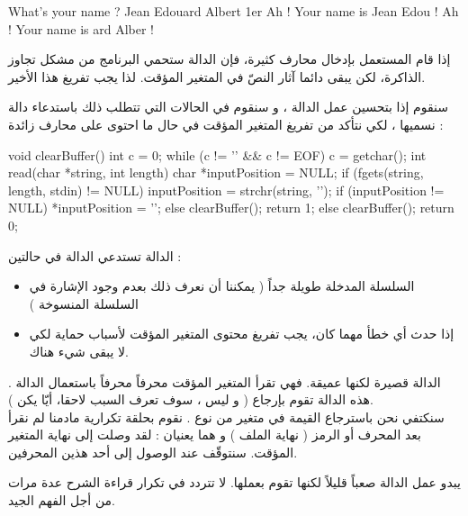 \begin{Console}
  What's your name ? Jean Edouard Albert 1er
  Ah ! Your name is Jean Edou !
  Ah ! Your name is ard Alber !
\end{Console}

إذا قام المستعمل بإدخال محارف كثيرة، فإن الدالة
ستحمي البرنامج من مشكل تجاوز الذاكرة، لكن يبقى دائما آثار النصّ في المتغير المؤقت. لذا يجب تفريغ هذا الأخير.

سنقوم إذا بتحسين عمل الدالة
،
و سنقوم في الحالات التي تتطلب ذلك باستدعاء دالة نسميها
،
لكي نتأكد من تفريغ المتغير المؤقت في حال ما احتوى على محارف زائدة :

\begin{Csource}
  void clearBuffer()
  {
  	int c = 0;
  	while (c != '\n' && c != EOF)
  	{
      		c = getchar();
  	}
  }
  int read(char *string, int length)
  {
  	char *inputPosition = NULL;
  	if (fgets(string, length, stdin) != NULL)
  	{
      		inputPosition = strchr(string, '\n');
      		if (inputPosition != NULL)
      		 {
          			*inputPosition = '\0';
      		}
      		else
      		 {
          			clearBuffer();
      		}
      		return 1;
  	 }
  	else
  	{
      		clearBuffer();
      		return 0;
  	 }
  }
\end{Csource}

الدالة
تستدعي الدالة
في حالتين :

\begin{itemize}
  \item السلسلة المدخلة طويلة جداً ( يمكننا أن نعرف ذلك بعدم وجود الإشارة
في السلسلة المنسوخة )
  \item إذا حدث أي خطأ مهما كان، يجب تفريغ محتوى المتغير المؤقت لأسباب حماية لكي لا يبقى شيء هناك.
\end{itemize}

الدالة
قصيرة لكنها عميقة. فهي تقرأ المتغير المؤقت محرفاً محرفاً باستعمال الدالة
.
هذه الدالة تقوم بإرجاع
( و ليس
،
سوف تعرف السبب لاحقا، أيّا يكن ).\\
سنكتفي نحن باسترجاع القيمة في متغير
من نوع
.
نقوم بحلقة تكرارية مادمنا لم نقرأ بعد المحرف
 أو الرمز
( نهاية الملف ) و هما يعنيان : لقد وصلت إلى نهاية المتغير المؤقت. سنتوقّف عند الوصول إلى أحد هذين المحرفين.

يبدو عمل الدالة
صعباً قليلاً لكنها تقوم بعملها. لا تتردد في تكرار قراءة الشرح عدة مرات من أجل الفهم الجيد.


